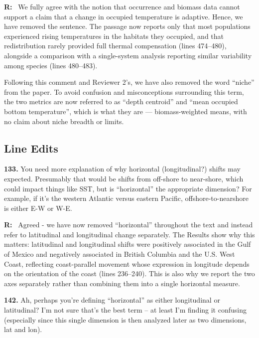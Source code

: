 \documentclass[11pt]{article}
\newcommand{\reviewer}[1]{\par\medskip\noindent\textcolor{revcolor}{#1}\par}
\newenvironment{reply}
{\par\smallskip\begingroup\color{replycolor}\noindent\textbf{R:}\ }
{\endgroup\par\medskip}
\begin{document}
\begin{reply}
We fully agree with the notion that occurrence and biomass data cannot support a claim that a change in occupied temperature is adaptive. Hence, we have removed the sentence. The passage now reports only that most populations experienced rising temperatures in the habitats they occupied, and that redistribution rarely provided full thermal compensation (lines 474--480), alongside a comparison with a single-system analysis reporting similar variability among species (lines 480--483).

Following this comment and Reviewer 2's, we have also removed the word ``niche'' from the paper. To avoid confusion and misconceptions surrounding this term, the two metrics are now referred to as ``depth centroid'' and ``mean occupied bottom temperature'', which is what they are --- biomass-weighted means, with no claim about niche breadth or limits.
\end{reply}

\subsection*{Line Edits}

\reviewer{\textbf{133.} You need more explanation of why horizontal (longitudinal?) shifts may expected. Presumably that would be shifts from off-shore to near-shore, which could impact things like SST, but is ``horizontal'' the appropriate dimension? For example, if it's the western Atlantic versus eastern Pacific, offshore-to-nearshore is either E-W or W-E.}

\begin{reply}
Agreed - we have now removed ``horizontal'' throughout the text and instead refer to latitudinal and longitudinal change separately. The Results show why this matters: latitudinal and longitudinal shifts were positively associated in the Gulf of Mexico and negatively associated in British Columbia and the U.S. West Coast, reflecting coast-parallel movement whose expression in longitude depends on the orientation of the coast (lines 236--240). This is also why we report the two axes separately rather than combining them into a single horizontal measure.
\end{reply}

\reviewer{\textbf{142.} Ah, perhaps you're defining ``horizontal'' as either longitudinal or latitudinal? I'm not sure that's the best term -- at least I'm finding it confusing (especially since this single dimension is then analyzed later as two dimensions, lat and lon).}
\end{document}
